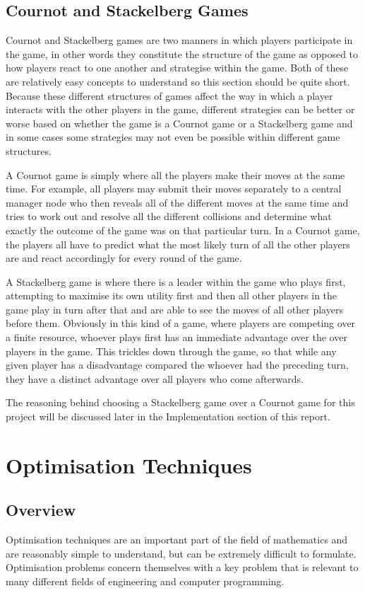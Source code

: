 \documentclass[a4paper, notitlepage]{report}
\begin{document}
\section{Cournot and Stackelberg Games}
\label{sec:org3e68d79}
Cournot and Stackelberg games are two manners in which players participate in
the game, in other words they constitute the structure of the game as opposed to
how players react to one another and strategise within the game. Both of these
are relatively easy concepts to understand so this section should be quite
short. Because these different structures of games affect the way in which a
player interacts with the other players in the game, different strategies can be
better or worse based on whether the game is a Cournot game or a Stackelberg
game and in some cases some strategies may not even be possible within different
game structures.

A Cournot game is simply where all the players make their moves at the same
time. For example, all players may submit their moves separately to a central
manager node who then reveals all of the different moves at the same time and
tries to work out and resolve all the different collisions and determine what
exactly the outcome of the game was on that particular turn. In a Cournot game,
the players all have to predict what the most likely turn of all the other
players are and react accordingly for every round of the game.

A Stackelberg game is where there is a leader within the game who plays first,
attempting to maximise its own utility first and then all other players in the
game play in turn after that and are able to see the moves of all other players
before them. Obviously in this kind of a game, where players are competing over
a finite resource, whoever plays first has an immediate advantage over the over
players in the game. This trickles down through the game, so that while any
given player has a disadvantage compared the whoever had the preceding turn,
they have a distinct advantage over all players who come afterwards.

The reasoning behind choosing a Stackelberg game over a Cournot game for this
project will be discussed later in the Implementation section of this report.
\chapter{Optimisation Techniques}
\label{sec:org3056fa0}
\section{Overview}
\label{sec:org7713321}
Optimisation techniques are an important part of the field of mathematics and
are reasonably simple to understand, but can be extremely difficult to
formulate. Optimisation problems concern themselves with a key problem that is
relevant to many different fields of engineering and computer programming.
\end{document}
